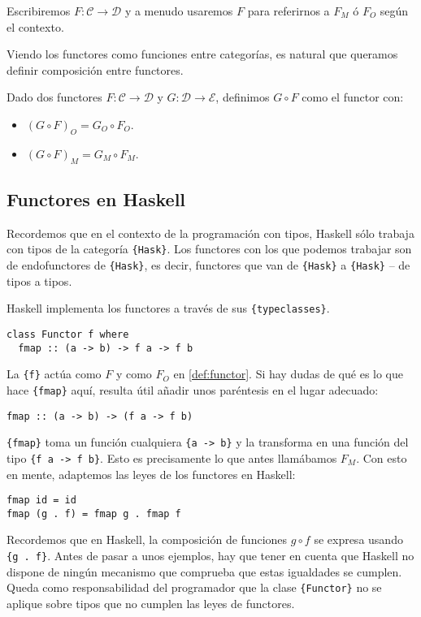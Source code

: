 \documentclass[12pt, twoside]{book}
\newcommand{\code}[1]{\Verb+{#1}+}
\newcommand{\cat}{{\mathcal{C}}}
\begin{document}
Escribiremos $F \colon \cat \to \mathcal{D}$ y a menudo usaremos $F$ para referirnos a $F_M$ ó $F_O$ según el contexto.

Viendo los functores como funciones entre categorías, es natural que queramos definir composición entre functores.
\begin{definition}
Dado dos functores $F \colon \cat \to \mathcal{D}$ y $G \colon \mathcal{D} \to \mathcal{E}$, definimos $G \circ F$ como el functor con:
\begin{itemize}
  \item $(G \circ F)_O = G_O \circ F_O$.
  \item $(G \circ F)_M = G_M \circ F_M$.
\end{itemize}
\end{definition}
\subsection{Functores en Haskell}
Recordemos que en el contexto de la programación con tipos, Haskell sólo trabaja con tipos de la categoría \code{Hask}.
Los functores con los que podemos trabajar son de endofunctores de \code{Hask}, es decir, functores que van de \code{Hask} a \code{Hask} -- de tipos a tipos.

Haskell implementa los functores a través de sus \code{typeclasses}.
\begin{verbatim}
class Functor f where
  fmap :: (a -> b) -> f a -> f b
\end{verbatim}

La \code{f} actúa como $F$ y como $F_O$ en \ref{def:functor}.
Si hay dudas de qué es lo que hace \code{fmap} aquí, resulta útil añadir unos paréntesis en el lugar adecuado:

\begin{verbatim}
fmap :: (a -> b) -> (f a -> f b)
\end{verbatim}

\code{fmap} toma un función cualquiera \code{a -> b} y la transforma en una función del tipo \code{f a -> f b}.
Esto es precisamente lo que antes llamábamos $F_M$.
Con esto en mente, adaptemos las leyes de los functores en Haskell:
\begin{verbatim}
fmap id = id
fmap (g . f) = fmap g . fmap f
\end{verbatim}
Recordemos que en Haskell, la composición de funciones $g \circ f$ se expresa usando \code{g . f}.
Antes de pasar a unos ejemplos, hay que tener en cuenta que Haskell no dispone de ningún mecanismo que comprueba que estas igualdades se cumplen.
Queda como responsabilidad del programador que la clase \code{Functor} no se aplique sobre tipos que no cumplen las leyes de functores. 
\end{document}
